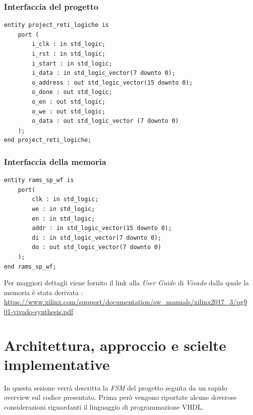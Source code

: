 \documentclass[11pt,a4paper]{article}
\begin{document}
        \subsubsection{Interfaccia del progetto}
            \begin{verbatim}
entity project_reti_logiche is
    port (
        i_clk : in std_logic;
        i_rst : in std_logic;
        i_start : in std_logic;
        i_data : in std_logic_vector(7 downto 0);
        o_address : out std_logic_vector(15 downto 0);
        o_done : out std_logic;
        o_en : out std_logic;
        o_we : out std_logic;
        o_data : out std_logic_vector (7 downto 0)
    );
end project_reti_logiche;
            \end{verbatim}
        \newpage
        \subsubsection{Interfaccia della memoria}
            \begin{verbatim}
entity rams_sp_wf is
    port(
        clk : in std_logic;
        we : in std_logic;
        en : in std_logic;
        addr : in std_logic_vector(15 downto 0);
        di : in std_logic_vector(7 downto 0);
        do : out std_logic_vector(7 downto 0)
    );
end rams_sp_wf;
            \end{verbatim}
            Per maggiori dettagli viene fornito il link alla \textit{User Guide} di \textit{Vivado} dalla quale la memoria è stata derivata : \url{https://www.xilinx.com/support/documentation/sw\_manuals/xilinx2017\_3/ug901-vivado-synthesis.pdf}
    \section{Architettura, approccio e scielte implementative}
        In questa sezione verrà descritta la \textit{FSM} del progetto seguita da un rapido overview sul codice presentato. Prima però vengono riportate alcune doverose considerazioni
        riguardanti il linguaggio di programmazione VHDL.
\end{document}
